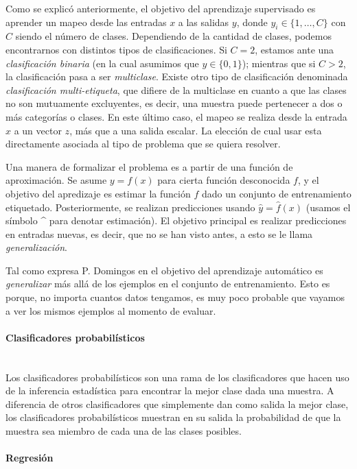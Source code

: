 		Como se explicó anteriormente, el objetivo del aprendizaje supervisado es aprender un mapeo desde las entradas $x$ a las salidas $y$, donde $y_i \in \{1,\dots,C\}$ con $C$ siendo el número de clases. Dependiendo de la cantidad de clases, podemos encontrarnos con distintos tipos de clasificaciones. Si $C=2$, estamos ante una \textit{clasificación binaria} (en la cual asumimos que $y\in\{0,1\}$); mientras que si $C>2$, la clasificación pasa a ser \textit{multiclase}. Existe otro tipo de clasificación denominada \textit{clasificación multi-etiqueta}, que difiere de la multiclase en cuanto a que las clases no son mutuamente excluyentes, es decir, una muestra puede pertenecer a dos o más categorías o clases. En este último caso, el mapeo se realiza desde la entrada $x$ a un vector $z$, más que a una salida escalar. La elección de cual usar esta directamente asociada al tipo de problema que se quiera resolver.
		
		Una manera de formalizar el problema es a partir de una función de aproximación. Se asume $y = f(x)$ para cierta función desconocida $f$, y el objetivo del apredizaje es estimar la función $f$ dado un conjunto de entrenamiento etiquetado. Posteriormente, se realizan predicciones usando $\hat{y} = \hat{f}(x)$ (usamos el símbolo \string^ para denotar estimación). El objetivo principal es realizar predicciones en entradas nuevas, es decir, que no se han visto antes, a esto se le llama \textit{generalización}.
		
		Tal como expresa P. Domingos en \cite{PDomingo} el objetivo del aprendizaje automático es \textit{generalizar} más allá de los ejemplos en el conjunto de entrenamiento. Esto es porque, no importa cuantos datos tengamos, es muy poco probable que vayamos a ver los mismos ejemplos al momento de evaluar.
		
	\paragraph{Clasificadores probabilísticos} ~\\

		Los clasificadores probabilísticos son una rama de los clasificadores que hacen uso de la inferencia estadística para encontrar la mejor clase dada una muestra. A diferencia de otros clasificadores que simplemente dan como salida la mejor clase, los clasificadores probabilísticos muestran en su salida la probabilidad de que la muestra sea miembro de cada una de las clases posibles.


	\paragraph{Regresión} ~\\
	

